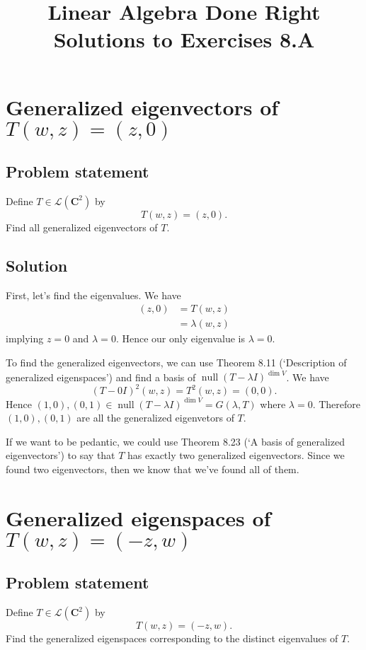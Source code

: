 \documentclass{article}
\title{Linear Algebra Done Right\\Solutions to Exercises 8.A}
\author{}
\date{}
\begin{document}
\maketitle

\section{Generalized eigenvectors of $T(w,z)=(z,0)$}
\subsection*{Problem statement}
Define $T\in\mathcal{L}(\mathbf{C}^2)$ by
\[T(w,z)=(z,0).\]
Find all generalized eigenvectors of $T$.

\subsection*{Solution}
First, let's find the eigenvalues. 
We have
\begin{align*}
    (z,0)&=T(w,z)\\
    &=\lambda (w,z)
\end{align*}
implying $z=0$ and $\lambda=0$. 
Hence our only eigenvalue is $\lambda=0$.

To find the generalized eigenvectors, we can use Theorem 8.11 (`Description of generalized eigenspaces') and find a basis of $\operatorname{null}(T-\lambda I)^{\operatorname{dim}V}$. 
We have
\[(T-0I)^2(w,z)=T^2(w,z)=(0,0).\]
Hence $(1,0),(0,1)\in\operatorname{null}(T-\lambda I)^{\operatorname{dim}V}=G(\lambda,T)$ where $\lambda=0$. 
Therefore $(1,0),(0,1)$ are all the generalized eigenvetors of $T$.

If we want to be pedantic, we could use Theorem 8.23 (`A basis of generalized eigenvectors') to say that $T$ has exactly two generalized eigenvectors. 
Since we found two eigenvectors, then we know that we've found all of them.

\clearpage

\section{Generalized eigenspaces of $T(w,z)=(-z,w)$}
\subsection*{Problem statement}
Define $T\in\mathcal{L}(\mathbf{C}^2)$ by
\[T(w,z)=(-z,w).\]
Find the generalized eigenspaces corresponding to the distinct eigenvalues of $T$.
\end{document}
